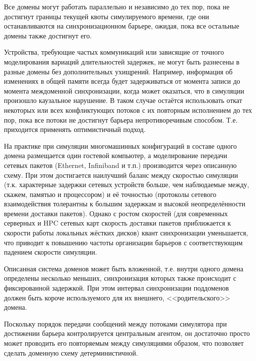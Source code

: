 \begin{enumerate*}
\item Все домены могут работать параллельно и независимо до тех пор, пока не достигнут границы текущей квоты симулируемого времени, где они останавливаются на синхронизационном барьере, ожидая, пока все остальные домены также достигнут его.

\item Устройства, требующие частых коммуникаций или зависящие от точного моделирования вариаций длительностей задержек, не могут быть разнесены в разные домены без дополнительных ухищрений. Например, информация об изменениях в общей памяти всегда будет задерживаться от момента записи до момента междоменной синхронизации, когда может оказаться, что в симуляции произошло каузальное нарушение. В таком случае остаётся использовать откат некоторых или всех конфликтующих потоков с их повторным исполнением до тех пор, пока все потоки не достигнут барьера непротиворечивым способом. Т.е. приходится применять оптимистичный подход.
\end{enumerate*}

На практике при симуляции многомашинных конфигураций в составе одного домена размещается один гостевой компьютер, а моделирование передачи сетевых пакетов (Ethernet, Infiniband и т.п.) производится через описанную схему. При этом достигается наилучший баланс между скоростью симуляции (т.к. характерные задержки сетевых устройств больше, чем наблюдаемые между, скажем, памятью и процессором) и её точностью (протоколы сетевого взаимодействия толерантны к большим задержкам и высокой неопределённости времени доставки пакетов). Однако с ростом скоростей (для современных серверных и HPC сетевых карт скорость доставки пакетов приближается к скорости работы локальных жёстких дисков) квант синхронизации уменьшается, что приводит к повышению частоты организации барьеров с  соответствующим падением скорости симуляции.

Описанная система доменов может быть вложенной, т.е. внутри одного домена определены несколько меньших, синхронизация которых также происходит с фиксированной задержкой. При этом интервал синхронизации поддоменов должен быть короче используемого для их внешнего, <<родительского>>  домена.

Поскольку порядок передачи сообщений между потоками симулятора при достижении барьера контролируется центральным агентом, он достаточно просто может проводить его повторяемым между симуляциями образом, что позволяет сделать доменную схему детерминистичной.

